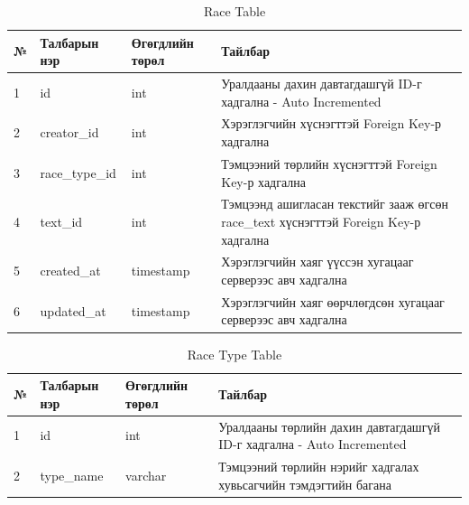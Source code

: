 \begin{table}[h]
	\caption{Race Table}
	\begin{tabular}{|l|l|l|p{8cm}|}
		\hline
		№ & Талбарын нэр   & Өгөгдлийн төрөл & Тайлбар                                                                             \\ \hline
		1 & id             & int             & Уралдааны дахин давтагдашгүй ID-г хадгална - Auto Incremented                       \\ \hline
		2 & creator\_id    & int             & Хэрэглэгчийн хүснэгттэй Foreign Key-р хадгална                                      \\ \hline
		3 & race\_type\_id & int             & Тэмцээний төрлийн хүснэгттэй Foreign Key-р хадгална                                 \\ \hline
		4 & text\_id       & int             & Тэмцээнд ашигласан текстийг зааж өгсөн race\_text хүснэгттэй Foreign Key-р хадгална \\ \hline
		5 & created\_at    & timestamp       & Хэрэглэгчийн хаяг үүссэн хугацааг серверээс авч хадгална                            \\ \hline
		6 & updated\_at    & timestamp       & Хэрэглэгчийн хаяг өөрчлөгдсөн хугацааг серверээс авч хадгална                       \\ \hline
	\end{tabular}
\end{table}


\begin{table}[h]
	\caption{Race Type Table}
	\begin{tabular}{|l|l|l|p{8cm}|}
		\hline
		№ & Талбарын нэр & Өгөгдлийн төрөл & Тайлбар                                                               \\ \hline
		1 & id           & int             & Уралдааны төрлийн дахин давтагдашгүй ID-г хадгална - Auto Incremented \\ \hline
		2 & type\_name   & varchar         & Тэмцээний төрлийн нэрийг хадгалах хувьсагчийн тэмдэгтийн багана       \\ \hline
	\end{tabular}
\end{table}

